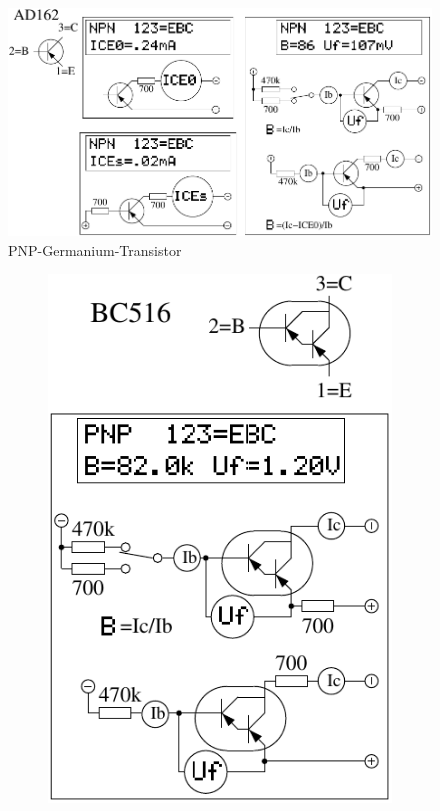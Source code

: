 \begin{figure}[H]
\centering
\includegraphics[width=.8\textwidth]{../FIG/BJT_AD162.pdf}
\caption{PNP-Germanium-Transistor}
\label{fig:BJT-PNP-Ge}
\end{figure}

\begin{figure}[H]
  \begin{subfigure}[b]{.5\textwidth}
    \centering
    \includegraphics[width=1.\textwidth]{../FIG/BJT_BC516.pdf}

\end{subfigure}
\end{figure}
